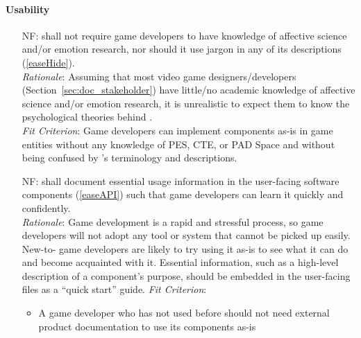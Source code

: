 \paragraph{Usability}
\noindent \begin{itemize}[wide=0pt, leftmargin=*]

    \item[NF\refstepcounter{nfnum}\thenfnum \label{N_Knowledge}:] \progname{}
    shall not require game developers to have knowledge of affective science
    and/or emotion research, nor should it use jargon in any of its
    descriptions (\ref{easeHide}). \vspace*{1mm}\\
    \textit{Rationale}: Assuming that most video game designers/developers
    (Section~\ref{sec:doc_stakeholder}) have little/no academic knowledge of
    affective science and/or emotion research, it is unrealistic to expect them
    to know the psychological theories behind \progname{}. \vspace*{1mm}\\
    \textit{Fit Criterion}: Game developers can implement \progname{}
    components as-is in game entities without any knowledge of PES, CTE, or PAD
    Space and without being confused by \progname{}'s terminology and
    descriptions.

    \item[NF\refstepcounter{nfnum}\thenfnum \label{N_CodeDoc}:] \progname{}
    shall document essential usage information in the user-facing software
    components (\ref{easeAPI}) such that game developers can learn it quickly
    and confidently. \vspace*{1mm}\\
    \textit{Rationale}: Game development is a rapid and stressful process, so
    game developers will not adopt any tool or system that cannot be picked up
    easily. New-to-\progname{} game developers are likely to try using it as-is
    to see what it can do and become acquainted with it. Essential information,
    such as a high-level description of a component's purpose, should be
    embedded in the user-facing files as a ``quick start'' guide.
    \vspace*{1mm}\linebreak
    \textit{Fit Criterion}: \begin{itemize}[noitemsep, nosep]
        \item A game developer who has not used \progname{} before should not
        need external product documentation to use its components as-is


\end{itemize}
\end{itemize}
